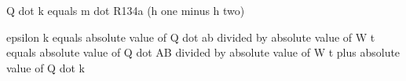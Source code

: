 Q dot k equals m dot R134a (h one minus h two)

epsilon k equals absolute value of Q dot ab divided by absolute value of W t equals absolute value of Q dot AB divided by absolute value of W t plus absolute value of Q dot k